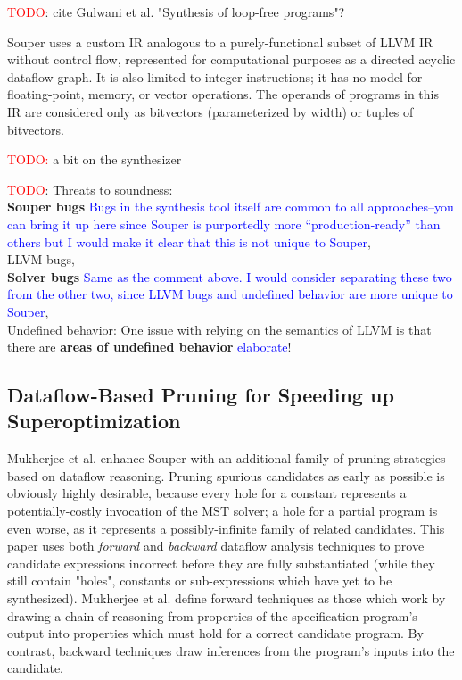 \documentclass[12pt,twoside]{reedthesis}
\newcommand{\red}[1]{\textcolor{red}{#1}}
\newcommand{\comment}[2]{\textbf{#1} \textcolor{blue}{#2}}
\begin{document}
            \red{TODO}: cite Gulwani et al. "Synthesis of loop-free programs"?
            
            Souper uses a custom IR analogous to a purely-functional subset of LLVM IR without control flow\footnotemark, represented for computational purposes as a directed acyclic dataflow graph.
            It is also limited to integer instructions; it has no model for floating-point, memory, or vector operations.
            The operands of programs in this IR are considered only as bitvectors (parameterized by width) or tuples of bitvectors.
            
            
            \red{TODO:} a bit on the synthesizer
            
            \red{TODO}: Threats to soundness:
            \\ \comment{Souper bugs}{Bugs in the synthesis tool itself are common to all approaches--you can bring it up here since Souper is purportedly more ``production-ready'' than others but I would make it clear that this is not unique to Souper},
            \\ LLVM bugs,
            \\ \comment{Solver bugs}{Same as the comment above. I would consider separating these two from the other two, since LLVM bugs and undefined behavior are more unique to Souper},
            \\ Undefined behavior: One issue with relying on the semantics of LLVM is that there are \comment{areas of undefined behavior}{elaborate}!

        \subsection{Dataflow-Based Pruning for Speeding up Superoptimization}
            Mukherjee et al. \cite{mukherjee2020dataflow} enhance Souper with an additional family of pruning strategies based on dataflow reasoning. 
            Pruning spurious candidates as early as possible is obviously highly desirable, because every hole for a constant represents a potentially-costly invocation of the MST solver; a hole for a partial program is even worse, as it represents a possibly-infinite family of related candidates.
            This paper uses both \textit{forward} and \textit{backward} dataflow analysis techniques to prove candidate expressions incorrect before they are fully substantiated (while they still contain "holes", constants or sub-expressions which have yet to be synthesized).
            Mukherjee et al. define forward techniques as those which work by drawing a chain of reasoning from properties of the specification program's output into properties which must hold for a correct candidate program.
            By contrast, backward techniques draw inferences from the program's inputs into the candidate.
            
\end{document}
